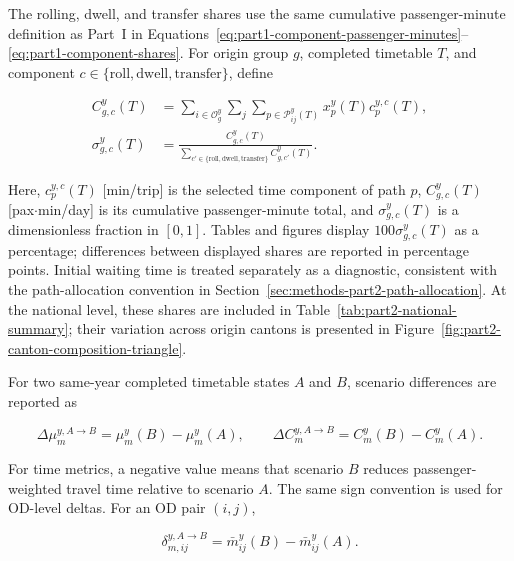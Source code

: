 \documentclass[preprint,12pt]{elsarticle}
\begin{document}
The rolling, dwell, and transfer shares use the same cumulative passenger-minute definition as Part~I in Equations~\eqref{eq:part1-component-passenger-minutes}--\eqref{eq:part1-component-shares}. For origin group \(g\), completed timetable \(T\), and component \(c\in\{\mathrm{roll},\mathrm{dwell},\mathrm{transfer}\}\), define

\begin{equation}
\begin{aligned}
C_{g,c}^{y}(T)
&=
\sum_{i\in\mathcal{O}_g^y}
\sum_j
\sum_{p\in\mathcal{P}_{ij}^{y}(T)}
x_p^y(T)c_p^{y,c}(T),\\[4pt]
\sigma_{g,c}^{y}(T)
&=
\frac{C_{g,c}^{y}(T)}
{\displaystyle\sum_{c'\in\{\mathrm{roll},\mathrm{dwell},\mathrm{transfer}\}}
C_{g,c'}^{y}(T)}.
\end{aligned}
\label{eq:part2-component-shares}
\end{equation}

Here, \(c_p^{y,c}(T)\) [min/trip] is the selected time component of path \(p\), \(C_{g,c}^{y}(T)\) [pax\(\cdot\)min/day] is its cumulative passenger-minute total, and \(\sigma_{g,c}^{y}(T)\) is a dimensionless fraction in \([0,1]\). Tables and figures display \(100\sigma_{g,c}^{y}(T)\) as a percentage; differences between displayed shares are reported in percentage points. Initial waiting time is treated separately as a diagnostic, consistent with the path-allocation convention in Section~\ref{sec:methods-part2-path-allocation}. At the national level, these shares are included in Table~\ref{tab:part2-national-summary}; their variation across origin cantons is presented in Figure~\ref{fig:part2-canton-composition-triangle}.

For two same-year completed timetable states \(A\) and \(B\), scenario differences are reported as

\begin{equation}
\Delta\mu_m^{y,A\to B}
=
\mu_m^y(B)-\mu_m^y(A),
\qquad
\Delta C_m^{y,A\to B}
=
C_m^y(B)-C_m^y(A).
\label{eq:part2-scenario-metric-delta}
\end{equation}

For time metrics, a negative value means that scenario \(B\) reduces passenger-weighted travel time relative to scenario \(A\). The same sign convention is used for OD-level deltas. For an OD pair \((i,j)\),

\begin{equation}
\delta_{m,ij}^{y,A\to B}
=
\bar m_{ij}^y(B)-\bar m_{ij}^y(A).
\label{eq:part2-od-cell-delta}
\end{equation}
\end{document}
